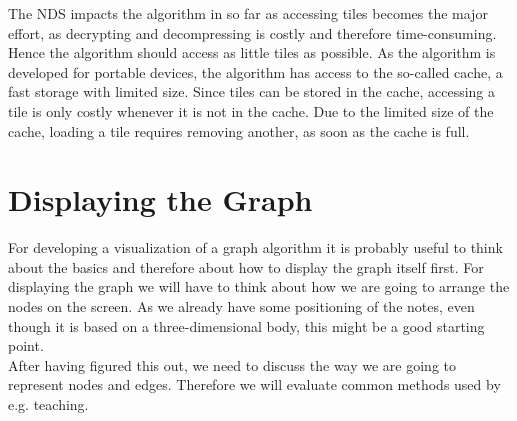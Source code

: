 \documentclass
[
	paper = a4,
    pagesize,
	12 pt,
	oneside,                       %
    open = right,
	DIV = calc,
	BCOR = 0 mm,                   %
	bibtotoc
]
{scrbook}
\begin{document}
\par The NDS impacts the algorithm in so far as accessing tiles becomes the major effort, as decrypting and decompressing is costly and therefore time-consuming.
Hence the algorithm should access as little tiles as possible.
As the algorithm is developed for portable devices, the algorithm has access to the so-called cache, a fast storage with limited size.
Since tiles can be stored in the cache, accessing a tile is only costly whenever it is not in the cache.
Due to the limited size of the cache, loading a tile requires removing another, as soon as the cache is full.




\section{Displaying the Graph} \label{graph}

For developing a visualization of a graph algorithm it is probably useful to think about the basics and therefore about how to display the graph itself first.
For displaying the graph we will have to think about how we are going to arrange the nodes on the screen.
As we already have some positioning of the notes, even though it is based on a three-dimensional body, this might be a good starting point.
\\After having figured this out, we need to discuss the way we are going to represent nodes and edges.
Therefore we will evaluate common methods used by e.g. teaching.
\end{document}
